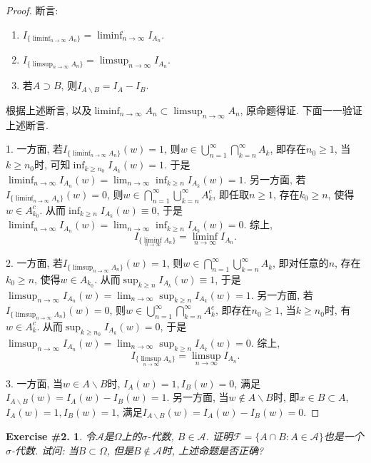 \documentclass[UTF8, a4paper]{article}
\newtheorem{exercise}{Exercise \#2.}
\begin{document}
\begin{proof}
断言:
\begin{enumerate}
    \item \(I_{\{\liminf_{n\to \infty} A_n\}} = \liminf_{n\to \infty}I_{A_n}\).
    \item \(I_{\{\limsup_{n\to \infty} A_n\}} = \limsup_{n\to \infty}I_{A_n}\).
    \item 若\(A \supset B\), 则\(I_{A\backslash B} = I_A - I_B\).
\end{enumerate}
根据上述断言, 以及\(\liminf _{n \rightarrow \infty} A_n \subset \limsup _{n \rightarrow \infty} A_n\), 原命题得证. 下面一一验证上述断言.

1. 一方面, 若\(I_{\{\liminf_{n\to \infty} A_n\}}(w) = 1\), 则\(w \in \bigcup_{n=1}^\infty \bigcap_{k=n}^\infty A_k\), 即存在\(n_0 \geq 1\), 当\(k \geq n_0\)时, 
可知\(\inf_{k \geq n_0} I_{A_k}(w) = 1\).
于是
\(\liminf_{n\to \infty} I_{A_n}(w) = \lim_{n\to \infty} \inf_{k\geq n} I_{A_k}(w) = 1\). 
另一方面, 若\(I_{\{\liminf_{n\to \infty} A_n\}}(w) = 0\), 则\(w \in \bigcap_{n=1}^\infty \bigcup_{k=n}^\infty A_k^c\), 即任取\(n\geq 1\), 存在\(k_0 \geq n\), 使得\(w \in A_{k_0}^c\).
从而\(\inf_{k\geq n} I_{A_k}(w) \equiv 0\), 
于是\(\liminf_{n\to \infty} I_{A_n}(w) = \lim_{n\to \infty} \inf_{k\geq n} I_{A_k}(w) = 0\). 
综上, 
$$
I_{\{\liminf_{n\to \infty} A_n\}} = \liminf_{n\to \infty}I_{A_n}.
$$

2. 一方面, 若\(I_{\{\limsup_{n\to \infty} A_n\}}(w) = 1\), 则\(w \in \bigcap_{n=1}^\infty \bigcup_{k=n}^\infty A_k\), 即对任意的\(n\), 存在\(k_0 \geq n\), 使得\(w \in A_{k_0}\).
从而\(\sup_{k\geq n} I_{A_k}(w) \equiv 1\), 于是\(\limsup_{n\to \infty} I_{A_n} (w) = \lim_{n\to\infty}\sup_{k\geq n} I_{A_k}(w) = 1\).
另一方面, 若\(I_{\{\limsup_{n\to \infty} A_n\}}(w) = 0\), 则\(w \in \bigcup_{n=1}^\infty \bigcap_{k=n}^\infty A_k^c\), 即存在\(n_0 \geq 1\), 当\(k \geq n_0\)时, 有\(w \in A_k^c\).
从而\(\sup_{k\geq n_0}I_{A_k}(w) = 0\), 于是\(\limsup_{n\to \infty} I_{A_n}(w) = \lim_{n\to \infty}\sup_{k\geq n} I_{A_k}(w) = 0\).
综上, 
$$
I_{\{\limsup_{n\to \infty} A_n\}} = \limsup_{n\to \infty}I_{A_n}.
$$

3. 一方面, 当\(w \in A\backslash B\)时, \(I_A(w) = 1, I_B(w) = 0\), 满足\(I_{A\backslash B}(w) = I_A(w) - I_B(w) = 1\).
另一方面, 当\(w \notin A\backslash B\)时, 即\(x\in B \subset A\), \(I_A(w) = 1, I_B(w) = 1\), 满足\(I_{A\backslash B}(w) = I_A(w) - I_B(w) = 0\).
\end{proof}

\begin{framed}
\begin{exercise}
令\(\mathcal{A}\)是\(\Omega\)上的\(\sigma\)-代数, \(B\in \mathcal{A}\). 证明\(\mathcal{F} = \{A\cap B : A\in\mathcal{A}\}\)也是一个\(\sigma\)-代数.
试问: 当\(B \subset \Omega\), 但是\(B \notin \mathcal{A}\)时, 上述命题是否正确?
\end{exercise}
\end{framed}
\end{document}
